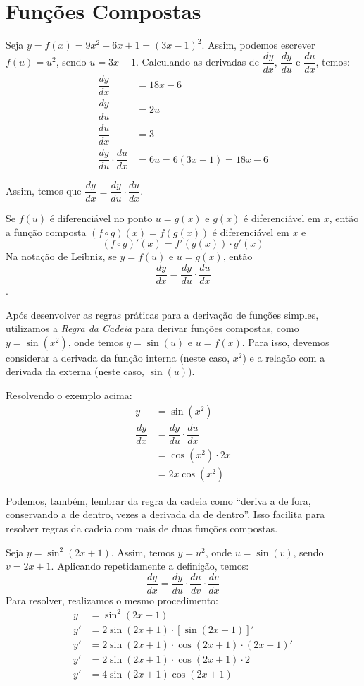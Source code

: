 \section[Regra da Cadeia]{Funções Compostas}
\begin{exemplo}
Seja $y=f(x)=9x^2-6x+1=(3x-1)^2$. Assim, podemos escrever $f(u)=u^2$, sendo $u=3x-1$. Calculando as derivadas de $\dfrac{dy}{dx}$, $\dfrac{dy}{du}$ e $\dfrac{du}{dx}$, temos:
\begin{align*}
\dfrac{dy}{dx}&=18x-6 \\
\dfrac{dy}{du}&=2u \\
\dfrac{du}{dx}&=3 \\
\dfrac{dy}{du}\cdot \dfrac{du}{dx}&=6u=6(3x-1)=18x-6
\end{align*}

Assim, temos que $\dfrac{dy}{dx}=\dfrac{dy}{du}\cdot \dfrac{du}{dx}$.
\end{exemplo}

\begin{teo}
Se $f(u)$ é diferenciável no ponto $u=g(x)$ e $g(x)$ é diferenciável em $x$, então a função composta $(f\circ g)(x)=f(g(x))$ é diferenciável em $x$ e \[(f\circ g)'(x)=f'(g(x))\cdot g'(x)\] Na notação de Leibniz, se $y=f(u)$ e $u=g(x)$, então \[\dfrac{dy}{dx}=\dfrac{dy}{du}\cdot \dfrac{du}{dx}\].
\end{teo}

Após desenvolver as regras práticas para a derivação de funções simples, utilizamos a \emph{Regra da Cadeia} para derivar funções compostas, como $y=\sin(x^2)$, onde temos $y=\sin(u)$ e $u=f(x)$. Para isso, devemos considerar a derivada da função interna (neste caso, $x^2$) e a relação com a derivada da externa (neste caso, $\sin(u)$).
\begin{exemplo}
Resolvendo o exemplo acima:
\begin{align*}
y&=\sin(x^2)\\
\dfrac{dy}{dx}&=\dfrac{dy}{du}\cdot \dfrac{du}{dx}\\
&=\cos(x^2)\cdot 2x\\
&=2x\cos(x^2)
\end{align*}
\end{exemplo}

Podemos, também, lembrar da regra da cadeia como ``deriva a de fora, conservando a de dentro, vezes a derivada da de dentro''. Isso facilita para resolver regras da cadeia com mais de duas funções compostas.
\begin{exemplo}
Seja $y=\sin^2(2x+1)$. Assim, temos $y=u^2$, onde $u=\sin(v)$, sendo $v=2x+1$. Aplicando repetidamente a definição, temos:
\[\dfrac{dy}{dx}=\dfrac{dy}{du}\cdot \dfrac{du}{dv} \cdot \dfrac{dv}{dx}\]
Para resolver, realizamos o mesmo procedimento:
\begin{align*}
y &=\sin^2(2x+1) \\
y' &=2\sin(2x+1) \cdot [ \sin(2x+1)]' \\
y' &=2\sin(2x+1) \cdot \cos(2x+1) \cdot (2x+1)' \\
y' &=2\sin(2x+1) \cdot \cos(2x+1) \cdot 2 \\
y' &=4\sin(2x+1) \cos(2x+1)
\end{align*}
\end{exemplo}

